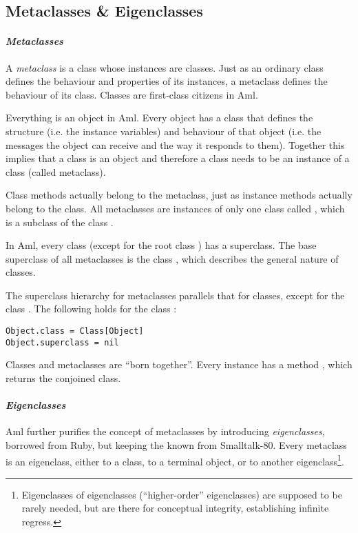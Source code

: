 \subsection{Metaclasses \& Eigenclasses}
\label{sec:metaclasses}
\label{sec:eigenclasses}

\paragraph{\em Metaclasses}
A {\em metaclass} is a class whose instances are classes. Just as an ordinary class defines the behaviour and properties of its instances, a metaclass defines the behaviour of its class. Classes are first-class citizens in Aml. 

Everything is an object in Aml. Every object has a class that defines the structure (i.e. the instance variables) and behaviour of that object (i.e. the messages the object can receive and the way it responds to them). Together this implies that a class is an object and therefore a class needs to be an instance of a class (called metaclass). 

Class methods actually belong to the metaclass, just as instance methods actually belong to the class. All metaclasses are instances of only one class called , which is a subclass of the class . 

In Aml, every class (except for the root class ) has a superclass. The base superclass of all metaclasses is the class , which describes the general nature of classes. 

The superclass hierarchy for metaclasses parallels that for classes, except for the class . The following holds for the class :
\begin{lstlisting}[deletekeywords={class}]
Object.class = Class[Object]
Object.superclass = nil
\end{lstlisting}

Classes and metaclasses are ``born together''. Every  instance has a method , which returns the conjoined class. 

\paragraph{\em Eigenclasses}
Aml further purifies the concept of metaclasses by introducing {\em eigenclasses}, borrowed from Ruby, but keeping the  known from Smalltalk-80. Every metaclass is an eigenclass, either to a class, to a terminal object, or to another eigenclass\footnote{Eigenclasses of eigenclasses (``higher-order'' eigenclasses) are supposed to be rarely needed, but are there for conceptual integrity, establishing infinite regress.}. 

